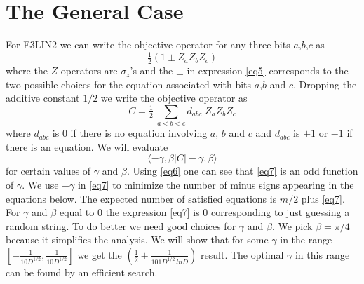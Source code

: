 \documentclass[t11pt,preprint,preprintnumbers]{revtex4}
\begin{document}
\section{The General Case}

For E3LIN2 we can write the objective operator for any three bits $a$,$b$,$c$ as
\begin{equation}\label{eq5}
\tfrac{1}{2}\left(1 \pm  Z_a  Z_b Z_c\right)
\end{equation}
where the $Z$ operators are $\sigma_z$'s  and the $\pm$ in expression \eqref{eq5} corresponds to the two possible choices for the equation associated with bits $a$,$b$ and $c$.  Dropping the additive constant $1/2$ we write the objective operator as
\begin{equation}\label{eq6}
C = \tfrac{1}{2}\ \sum_{a < b <c}  d_{abc}  \; Z_a Z_b Z_c
\end{equation}
\noindent where $d_{abc}$ is 0 if there is no equation involving $a$, $b$ and $c$ and $d_{abc}$ is $+1$ or $-1$ if there is an equation.  We will evaluate  
\begin{equation}\label{eq7}
\langle - \gamma , \beta | C | - \gamma , \beta \rangle 
\end{equation}
\noindent for certain values of $\gamma$ and $\beta$. Using \eqref{eq6} one can see that \eqref{eq7} is an odd function of $\gamma$. We use $-\gamma$ in \eqref{eq7} to minimize the number of minus signs appearing in the equations below. The expected number of satisfied equations is $m/2$  plus \eqref{eq7}.  For $\gamma$ and $\beta$ equal to 0 the expression \eqref{eq7} is 0 corresponding to just guessing a random string.  To do better we need good choices for $\gamma$ and $\beta$. We pick $\beta = \pi/4$ because it simplifies the analysis. We will show that for some $\gamma$ in the range $[-\frac{1}{10 D^{1/2}}, \frac{1}{10 D^{1/2}}]$ we get the $\left(\frac{1}{2} + \frac{1}{101 D^{1/2} \, ln D}\right)$ result. The optimal $\gamma$ in this range can be found by an efficient search.   
\end{document}
